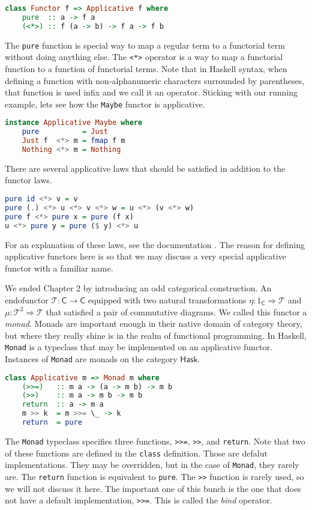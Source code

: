 \documentclass[MS, xcolor=dvipsnames]{wfuthesis}
\def\sC{\mathsf{C}}
\def\cT{\mathcal{T}}
\def\Hask{\mathsf{Hask}}
\theoremstyle{definition}
\begin{document}
\begin{lstlisting}[language=Haskell]
class Functor f => Applicative f where
    pure  :: a -> f a
    (<*>) :: f (a -> b) -> f a -> f b
\end{lstlisting}
The \lstinline{pure} function is special way to map a regular term to a functorial term without doing anything else. The \lstinline{<*>} operator is a way to map a functorial function to a function of functorial terms. Note that in Haskell syntax, when defining a function with non-alphanumeric characters surrounded by parentheses, that function is used infix and we call it an operator. Sticking with our running example, lets see how the \lstinline{Maybe} functor is applicative. 
\begin{lstlisting}[language=Haskell]
instance Applicative Maybe where
    pure          = Just
    Just f  <*> m = fmap f m
    Nothing <*> m = Nothing
\end{lstlisting}
There are several applicative laws that should be satisfied in addition to the functor laws. 
\begin{lstlisting}[language=Haskell]
pure id <*> v = v
pure (.) <*> u <*> v <*> w = u <*> (v <*> w)
pure f <*> pure x = pure (f x)
u <*> pure y = pure ($ y) <*> u
\end{lstlisting}
For an explanation of these laws, see the documentation \cite{Prelude}. The reason for defining applicative functors here is so that we may discuss a very special applicative functor with a familiar name. \par 
We ended Chapter 2 by introducing an odd categorical construction. An endofunctor $\cT: \sC \to \sC$ equipped with two natural transformations $\eta: 1_\sC \Rightarrow \cT$ and $\mu: \cT^2 \Rightarrow \cT$ that satisfied a pair of commutative diagrams. We called this functor a \emph{monad}. Monads are important enough in their native domain of category theory, but where they really shine is in the realm of functional programming. In Haskell, \lstinline{Monad} is a typeclass that may be implemented on an applicative functor. Instances of \lstinline{Monad} are monads on the category $\Hask$. 
\begin{lstlisting}[language=Haskell]
class Applicative m => Monad m where
    (>>=)   :: m a -> (a -> m b) -> m b
    (>>)    :: m a -> m b -> m b
    return  :: a -> m a
    m >> k  = m >>= \_ -> k
    return  = pure
\end{lstlisting}
The \lstinline{Monad} typeclass specifies three functions, \lstinline{>>=}, \lstinline{>>}, and \lstinline{return}. Note that two of these functions are defined in the \lstinline{class} definition. Those are defalut implementations. They may be overridden, but in the case of \lstinline{Monad}, they rarely are. The \lstinline{return} function is equivalent to \lstinline{pure}. The \lstinline{>>} function is rarely used, so we will not discuss it here. The important one of this bunch is the one that does not have a default implementation, \lstinline{>>=}. This is called the \emph{bind} operator. \par 
\end{document}
